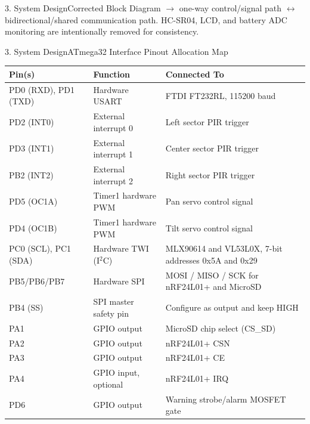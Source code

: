 \documentclass[aspectratio=169, 10pt]{beamer}
\begin{document}
\begin{frame}{3. System Design}{Corrected Block Diagram}
    {\tiny\color{TextDim} $\rightarrow$ one-way control/signal path \quad $\leftrightarrow$ bidirectional/shared communication path. HC-SR04, LCD, and battery ADC monitoring are intentionally removed for consistency.}
\end{frame}

\begin{frame}{3. System Design}{ATmega32 Interface Pinout Allocation Map}
    \scriptsize
    \begin{table}
        \centering
        \begin{tabular}{lll}
            \toprule
            \textbf{\color{Accent} Pin(s)} & \textbf{\color{Accent} Function} & \textbf{\color{Accent} Connected To} \\
            \midrule
            PD0 (RXD), PD1 (TXD) & Hardware USART & FTDI FT232RL, 115200 baud \\
            PD2 (INT0) & External interrupt 0 & Left sector PIR trigger \\
            PD3 (INT1) & External interrupt 1 & Center sector PIR trigger \\
            PB2 (INT2) & External interrupt 2 & Right sector PIR trigger \\
            PD5 (OC1A) & Timer1 hardware PWM & Pan servo control signal \\
            PD4 (OC1B) & Timer1 hardware PWM & Tilt servo control signal \\
            PC0 (SCL), PC1 (SDA) & Hardware TWI (I$^2$C) & MLX90614 and VL53L0X, 7-bit addresses 0x5A and 0x29 \\
            PB5/PB6/PB7 & Hardware SPI & MOSI / MISO / SCK for nRF24L01+ and MicroSD \\
            PB4 (SS) & SPI master safety pin & Configure as output and keep HIGH \\
            PA1 & GPIO output & MicroSD chip select (CS\_SD) \\
            PA2 & GPIO output & nRF24L01+ CSN \\
            PA3 & GPIO output & nRF24L01+ CE \\
            PA4 & GPIO input, optional & nRF24L01+ IRQ \\
            PD6 & GPIO output & Warning strobe/alarm MOSFET gate \\
            \bottomrule
        \end{tabular}
    \end{table}
\end{frame}
\end{document}
